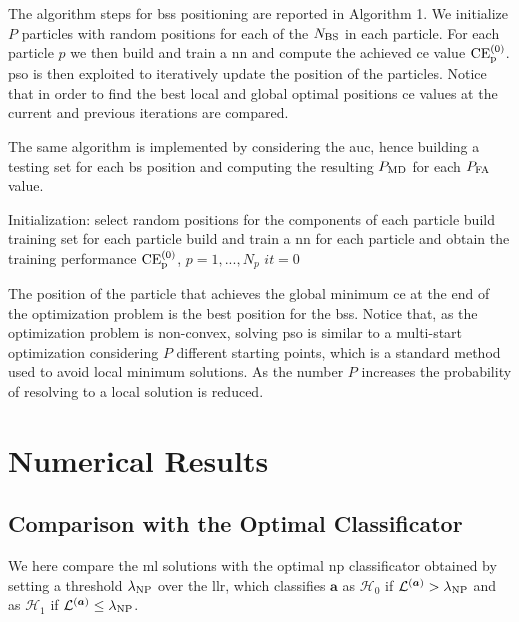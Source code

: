 \documentclass[twocolumns]{IEEEtran}
\begin{document}
The algorithm steps for \acp{bs} positioning are reported in Algorithm 1. We initialize $P$ particles with random positions for each of the $N_{\rm BS}$ in each particle. For each particle $p$ we then build and train a \ac{nn} and compute the achieved \ac{ce} value $\rm{CE}_p^{(0)}$. \ac{pso} is then exploited to iteratively update the position of the particles. Notice that in order to find the best local and global optimal positions \ac{ce} values at the current and previous iterations are compared. 

The same algorithm is implemented by considering the \ac{auc}, hence building a testing set for each \ac{bs} position and computing the resulting $P_{\rm MD}$ for each $P_{\rm FA}$ value.

 \begin{algorithm}[t]
   \scriptsize

  Initialization: select random positions for the components of each particle\;
                  build training set for each particle\;
                  build and train a \ac{nn} for each particle and obtain the training performance $\rm{CE}_p^{(0)}$, $p=1,...,N_p$\;
                  $it = 0$\;

    
\caption{BSs positioning algorithm}
 \end{algorithm}

The position of the particle that achieves the global minimum \ac{ce} at the end of the optimization problem is the best position for the \acp{bs}. Notice that, as the optimization problem is non-convex, solving \ac{pso} is similar to a multi-start optimization considering $P$ different starting points, which is a standard method used to avoid local minimum solutions. As the number $P$ increases the probability of resolving to a local solution is reduced.

\section{Numerical Results}
\subsection{Comparison with the Optimal Classificator}
We here compare the \ac{ml} solutions with the optimal \ac{np} classificator obtained by setting a threshold $\lambda_{\rm NP}$ over the \ac{llr}, which classifies $\bm{a}$ as $\mathcal{H}_0$ if $\mathcal{L}^{(\bm{a})} > \lambda_{\rm NP}$ and as $\mathcal{H}_1$ if $\mathcal{L}^{(\bm{a})} \le \lambda_{\rm NP}$.
\end{document}
